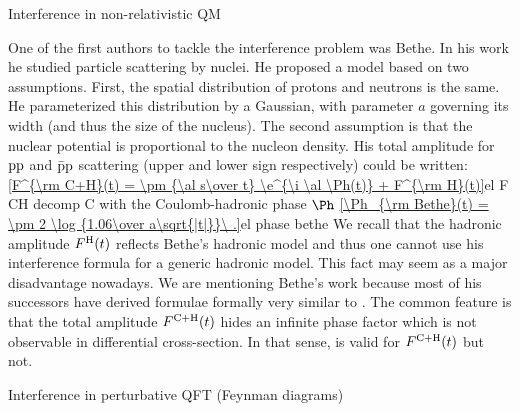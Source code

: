 \caption{Interference in non-relativistic QM}

One of the first authors to tackle the interference problem was Bethe. In his work  he studied particle scattering by nuclei. He proposed a model based on two assumptions. First, the spatial distribution of protons and neutrons is the same. He parameterized this distribution by a Gaussian, with parameter $a$ governing its width (and thus the size of the nucleus). The second assumption is that the nuclear potential is proportional to the nucleon density. His total amplitude for $\rm pp$ and $\rm \bar pp$ scattering (upper and lower sign respectively) could be written:
\eqref{F^{\rm C+H}(t) = \pm {\al s\over t} \e^{\i \al \Ph(t)} + F^{\rm H}(t)}{el F CH decomp C}
with the Coulomb-hadronic phase $\Ph$
\eqref{\Ph_{\rm Bethe}(t) = \pm 2 \log {1.06\over a\sqrt{|t|}}\ .}{el phase bethe}
We recall that the hadronic amplitude $F^{\rm H}(t)$ reflects Bethe's hadronic model and thus one cannot use his interference formula for a generic hadronic model. This fact may seem as a major disadvantage nowadays. We are mentioning Bethe's work because most of his successors have derived formulae formally very similar to . The common feature is that the total amplitude $F^{\rm C+H}(t)$ hides an infinite phase factor which is not observable in differential cross-section. In that sense,  is valid for $F^{\rm C+H}(t)$ but  not.

\caption{Interference in perturbative QFT (Feynman diagrams)}



